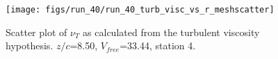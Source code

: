 \begin{figure}[H]
\centering
\texttt{[image: figs/run\_40/run\_40\_turb\_visc\_vs\_r\_meshscatter]}
\caption{Scatter plot of $\nu_T$ as calculated from the turbulent viscosity hypothesis. $z/c$=8.50, $V_{free}$=33.44, station 4.}
\label{fig:run_40_turb_visc_vs_r_meshscatter}
\end{figure}



